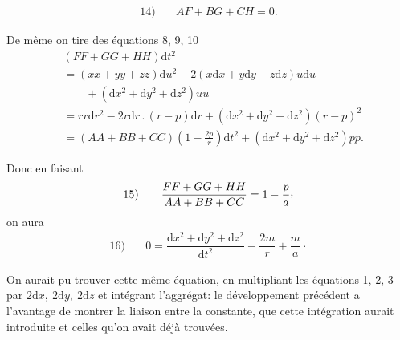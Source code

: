 \[
\begin{array}{rl}14)\quad&AF+BG+CH=0.\end{array}
\]
\par De même on tire des équations 8, 9, 10
\[
\begin{aligned}
&(FF+GG+HH)\mathrm{d}t^2\\
&=(xx+yy+zz)\mathrm{d}u^2-2(x\mathrm{d}x+y\mathrm{d}y+z\mathrm{d}z)u\mathrm{d}u\\
&\qquad{}+(\mathrm{d}x^2+\mathrm{d}y^2+\mathrm{d}z^2)uu\\
&=rr\mathrm{d}r^2-2r\mathrm{d}r\mathpunct{.}(r-p)\mathrm{d}r+(\mathrm{d}x^2+\mathrm{d}y^2+\mathrm{d}z^2)(r-p)^2\\
&=(AA+BB+CC)\left(1-\frac{2p}{r}\right)\mathrm{d}t^2+(\mathrm{d}x^2+\mathrm{d}y^2+\mathrm{d}z^2)pp.
\end{aligned}
\]
\par Donc en faisant
\[
\begin{array}{rl}15)\quad&\dfrac{FF+GG+HH}{AA+BB+CC}=1-\dfrac{p}{a}\mathpunct{\raisebox{.45ex}{,}}\end{array}
\]
on aura
\[
\begin{array}{rl}16)\quad&0=\dfrac{\mathrm{d}x^2+\mathrm{d}y^2+\mathrm{d}z^2}{\mathrm{d}t^2}-\dfrac{2m}{r}+\dfrac{m}{a}\mathpunct{\cdot}\end{array}
\]
\par On aurait pu trouver cette même équation, en multipliant les équations 1, 2, 3 par \(2\mathrm{d}x,\ 2\mathrm{d}y,\ 2\mathrm{d}z\) et intégrant l’aggrégat: le développement précédent a l’avantage de montrer la liaison entre la constante, que cette intégration aurait introduite et celles qu’on avait déjà trouvées.
\par
